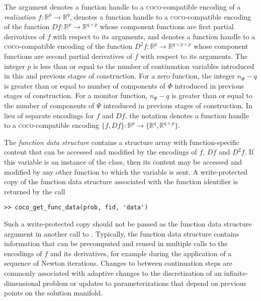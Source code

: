 The argument  denotes a function handle to a \textsc{coco}-compatible encoding of a \emph{realization}  $f:\mathbb{R}^{p}\rightarrow\mathbb{R}^{q}$,  denotes a function handle to a \textsc{coco}-compatible encoding of the function $Df:\mathbb{R}^{p}\rightarrow\mathbb{R}^{q\times p}$ whose component functions are first partial derivatives of $f$ with respect to its arguments, and  denotes a function handle to a \textsc{coco}-compatible encoding of the function $D^2f:\mathbb{R}^{p}\rightarrow\mathbb{R}^{q\times p\times p}$ whose component functions are second partial derivatives of $f$ with respect to its arguments. The integer $p$ is less than or equal to the number of continuation variables introduced in this and previous stages of construction. For a zero function, the integer $n_\Phi-q$ is greater than or equal to number of components of $\Phi$ introduced in previous stages of construction. For a monitor function, $n_\Psi-q$ is greater than or equal to the number of components of $\Psi$ introduced in previous stages of construction. In lieu of separate encodings for $f$ and $Df$, the notation  denotes a function handle to a \textsc{coco}-compatible encoding $\{f,Df\}:\mathbb{R}^p\rightarrow\{\mathbb{R}^{q},\mathbb{R}^{q\times p}\}$.

The \emph{function data structure}  contains a structure array with function-specific content that can be accessed and modified by the encodings of $f$, $Df$ and $D^2f$. If this variable is an instance of the  class, then its content may be accessed and modified by any other function to which the variable is sent. A write-protected copy of the function data structure associated with the function identifier  is returned by the call
\begin{lstlisting}[language=coco-highlight]
>> coco_get_func_data(prob, fid, 'data')
\end{lstlisting}
Such a write-protected copy should not be passed as the function data structure argument in another call to . Typically, the function data structure contains information that can be precomputed and reused in multiple calls to the encodings of $f$ and its derivatives, for example during the application of a sequence of Newton iterations. Changes to  between continuation steps are commonly associated with adaptive changes to the discretization of an infinite-dimensional problem or updates to parameterizations that depend on previous points on the solution manifold. 

